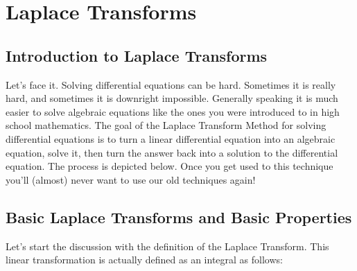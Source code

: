 \chapter{Laplace Transforms}

\section{Introduction to Laplace Transforms}
Let's face it.  Solving differential equations can be hard.  Sometimes it is really hard,
and sometimes it is downright impossible.  Generally speaking it is much easier to solve
algebraic equations like the ones you were introduced to in high school mathematics.  The
goal of the Laplace Transform Method for solving differential equations is to turn a
linear differential equation into an algebraic equation, solve it, then turn the answer
back into a solution to the differential equation.  The process is depicted below.  Once
you get used to this technique you'll (almost) never want to use our old techniques again!

\begin{center}
\end{center}


\newpage\section{Basic Laplace Transforms and Basic Properties}

Let's start the discussion with the definition of the Laplace Transform.  This linear
transformation is actually defined as an integral as follows: 

